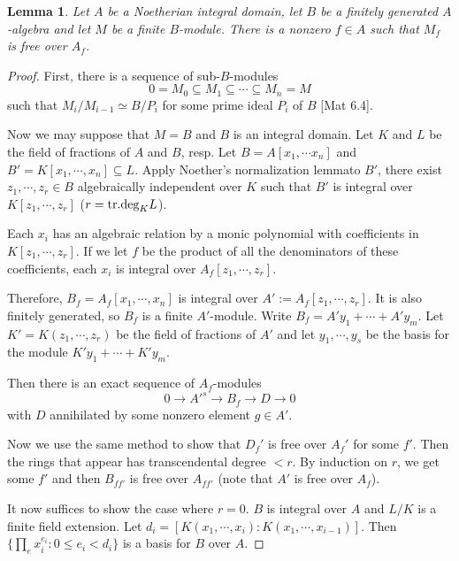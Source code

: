 \documentclass{article}
\theoremstyle{theorem}
\newtheorem{lemma}[theorem]{Lemma}
\begin{document}
    \begin{lemma} \label{locally_free}
        Let $A$ be a Noetherian integral domain, let $B$ be a finitely generated $A$-algebra and let $M$ be a finite $B$-module. There is a nonzero $f \in A$ such that $M_f$ is free over $A_f$.
    \end{lemma}
    \begin{proof}
        First, there is a sequence of sub-$B$-modules
        $$ 0 = M_0 \subseteq M_1 \subseteq \cdots \subseteq M_n = M$$
        such that $M_i/M_{i-1} \simeq B/P_i$ for some prime ideal $P_i$ of $B$ {[}Mat 6.4{]}.
        
        Now we may suppose that $M = B$ and $B$ is an integral domain. Let $K$ and $L$ be the field of fractions of $A$ and $B$, resp. Let $B = A[x_1, \cdots x_n]$ and $B' = K[x_1, \cdots, x_n] \subseteq L.$ Apply Noether's normalization lemmato $B'$, there exist  $z_1, \cdots, z_r \in B$ algebraically independent over $K$ such that $B'$ is integral over $K[z_1, \cdots, z_r]$ ($r = {\rm tr.deg}_K L$).
        
        Each $x_i$ has an algebraic relation by a monic polynomial with coefficients in $K[z_1, \cdots, z_r]$. If we let $f$ be the product of all the denominators of these coefficients, each $x_i$ is integral over $A_f[z_1, \cdots, z_r].$
        
        Therefore, $B_f = A_f[x_1, \cdots, x_n]$ is integral over $A' := A_f[z_1, \cdots, z_r]$. It is also finitely generated, so $B_f$ is a finite $A'$-module. Write $B_f = A'y_1 + \cdots +A'y_m$. Let $K' = K(z_1, \cdots, z_r)$ be the field of fractions of $A'$ and let $y_1, \cdots, y_s$ be the basis for the module $K'y_1 + \cdots + K'y_m.$
        
        Then there is an exact sequence of $A_f$-modules
        $$0 \rightarrow A'^s \rightarrow B_f \rightarrow D \rightarrow 0$$
        with $D$ annihilated by some nonzero element $g \in A'.$
        
        Now we use the same method to show that $D_f'$ is free over $A_f'$ for some $f'$. Then the rings that appear has transcendental degree $< \! r$. By induction on $r$, we get some $f'$ and then $B_{ff'}$ is free over $A_{ff'}$ (note that $A'$ is free over $A_f$).
        
        It now suffices to show the case where $r = 0$. $B$ is integral over $A$ and $L/K$ is a finite field extension. Let $d_i = [K(x_1, \cdots, x_i) \!:\! K(x_1, \cdots, x_{i-1})]$. Then $\{ \prod_{e} x_i^{e_i} : 0 \! \leq \! e_i \! < \! d_i \}$ is a basis for $B$ over $A$.
    \end{proof}
    
\end{document}
